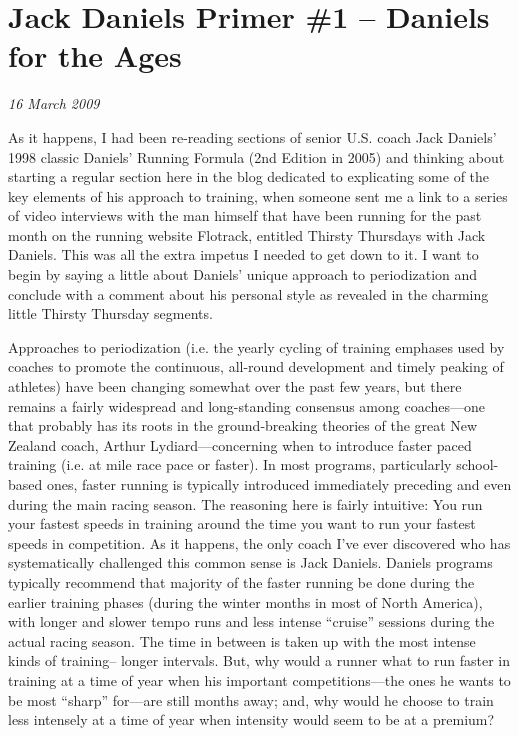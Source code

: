 \chapter{Jack Daniels Primer \#1 -- Daniels for the Ages}
\textit{16 March 2009}
\bigskip

As it happens, I had been re-reading sections of senior U.S. coach Jack Daniels’ 1998 classic Daniels’ Running Formula (2nd Edition in 2005) and thinking about starting a regular section here in the blog dedicated to explicating some of the key elements of his approach to training, when someone sent me a link to a series of video interviews with the man himself that have been running for the past month on the running website Flotrack, entitled Thirsty Thursdays with Jack Daniels. This was all the extra impetus I needed to get down to it. I want to begin by saying a little about Daniels’ unique approach to periodization and conclude with a comment about his personal style as revealed in the charming little Thirsty Thursday segments.

Approaches to periodization (i.e. the yearly cycling of training emphases used by coaches to promote the continuous, all-round development and timely peaking of athletes) have been changing somewhat over the past few years, but there remains a fairly widespread and long-standing consensus among coaches—one that probably has its roots in the ground-breaking theories of the great New Zealand coach, Arthur Lydiard—concerning when to introduce faster paced training (i.e. at mile race pace or faster). In most programs, particularly school-based ones, faster running is typically introduced immediately preceding and even during the main racing season. The reasoning here is fairly intuitive: You run your fastest speeds in training around the time you want to run your fastest speeds in competition. As it happens, the only coach I’ve ever discovered who has systematically challenged this common sense is Jack Daniels. Daniels programs typically recommend that majority of the faster running be done during the earlier training phases (during the winter months in most of North America), with longer and slower tempo runs and less intense “cruise” sessions during the actual racing season. The time in between is taken up with the most intense kinds of training-- longer intervals. But, why would a runner what to run faster in training at a time of year when his important competitions—the ones he wants to be most “sharp” for—are still months away; and, why would he choose to train less intensely at a time of year when intensity would seem to be at a premium?


